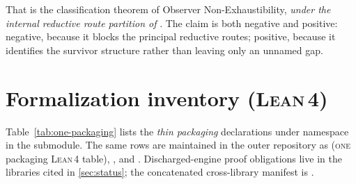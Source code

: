 \documentclass[11pt]{article}
\theoremstyle{plain}
\theoremstyle{definition}
\theoremstyle{remark}
\newcommand{\ONE}{\textsc{one}}
\newcommand{\Lean}{\textsc{Lean\,4}}
\begin{document}
That is the classification theorem of Observer Non-Exhaustibility,
\emph{under the internal reductive route partition of} .
The claim is both negative and positive: negative, because it blocks the
principal reductive routes; positive, because it identifies the survivor
structure rather than leaving only an unnamed gap.

\appendix

\section{\texorpdfstring{Formalization inventory (\Lean)}{Formalization inventory (Lean)}}
\label{app:formalization}

\noindent
Table~\ref{tab:one-packaging} lists the \emph{thin packaging} declarations
under namespace  in the
 submodule. The same rows are
maintained in the outer repository as  (\ONE{}
packaging \Lean{} table), , and\linebreak
{}. Discharged-engine proof obligations
live in the libraries cited in \cref{sec:status}; the concatenated
cross-library manifest is .
\end{document}
